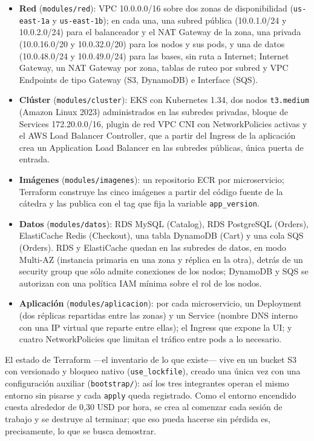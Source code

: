 \documentclass[11pt,a4paper]{article}
\newcommand{\code}[1]{\texttt{#1}}
\begin{document}
\begin{itemize}
  \item \textbf{Red} (\code{modules/red}): VPC 10.0.0.0/16 sobre dos zonas de disponibilidad
    (\code{us-east-1a} y \code{us-east-1b}); en cada una, una subred pública (10.0.1.0/24 y
    10.0.2.0/24) para el balanceador y el NAT Gateway de la zona, una privada (10.0.16.0/20 y
    10.0.32.0/20) para los nodos y sus pods, y una de datos (10.0.48.0/24 y 10.0.49.0/24)
    para las bases, sin ruta a Internet; Internet Gateway, un NAT Gateway por zona, tablas de
    ruteo por subred y VPC Endpoints de tipo Gateway (S3, DynamoDB) e Interface (SQS).
  \item \textbf{Clúster} (\code{modules/cluster}): EKS con Kubernetes 1.34, dos nodos
    \code{t3.medium} (Amazon Linux 2023) administrados en las subredes privadas, bloque de
    Services 172.20.0.0/16, plugin de red VPC CNI con NetworkPolicies activas y el AWS Load
    Balancer Controller, que a partir del Ingress de la aplicación crea un Application Load
    Balancer en las subredes públicas, única puerta de entrada.
  \item \textbf{Imágenes} (\code{modules/imagenes}): un repositorio ECR por microservicio;
    Terraform construye las cinco imágenes a partir del código fuente de la cátedra y las
    publica con el tag que fija la variable \code{app\_version}.
  \item \textbf{Datos} (\code{modules/datos}): RDS MySQL (Catalog), RDS PostgreSQL (Orders),
    ElastiCache Redis (Checkout), una tabla DynamoDB (Cart) y una cola SQS (Orders). RDS y
    ElastiCache quedan en las subredes de datos, en modo Multi-AZ (instancia primaria en una
    zona y réplica en la otra), detrás de un security group que sólo admite conexiones de los
    nodos; DynamoDB y SQS se autorizan con una política IAM mínima sobre el
    rol de los nodos.
  \item \textbf{Aplicación} (\code{modules/aplicacion}): por cada microservicio, un Deployment
    (dos réplicas repartidas entre las zonas) y un Service (nombre DNS interno con una IP virtual que reparte entre ellas);
    el Ingress que expone la UI; y cuatro NetworkPolicies que limitan el tráfico entre pods a
    lo necesario.
\end{itemize}

El estado de Terraform ---el inventario de lo que existe--- vive en un bucket S3 con versionado
y bloqueo nativo (\code{use\_lockfile}), creado una única vez con una configuración auxiliar
(\code{bootstrap/}): así los tres integrantes operan el mismo entorno sin pisarse y cada
\code{apply} queda registrado. Como el entorno encendido cuesta alrededor de 0,30 USD por
hora, se crea al comenzar cada sesión de trabajo y se destruye al terminar; que eso pueda
hacerse sin pérdida es, precisamente, lo que se busca demostrar.
\end{document}
